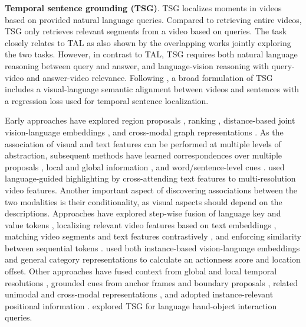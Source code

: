 \noindent
\textbf{Temporal sentence grounding (TSG)}. TSG  localizes moments in videos based on provided natural language queries. Compared to retrieving entire videos, TSG only retrieves relevant segments from a video based on queries. The task closely relates to TAL as also shown by the overlapping works  jointly exploring the two tasks. However, in contrast to TAL, TSG requires both natural language reasoning between query and answer, and language-vision reasoning with query-video and answer-video relevance. Following , a broad formulation of TSG includes a visual-language semantic alignment between videos and sentences with a regression loss used for temporal sentence localization.



Early approaches have explored region proposals , ranking , distance-based joint vision-language embeddings , and cross-modal graph representations . As
the association of visual and text features can be performed at multiple levels of abstraction, subsequent methods have learned correspondences over multiple proposals , local and global information , and word/sentence-level cues .  used language-guided highlighting by cross-attending text features to multi-resolution video features. Another important aspect of discovering associations between the two modalities is their conditionality, as visual aspects should depend on the descriptions. Approaches have explored step-wise fusion of language key and value tokens 
, localizing relevant video features based on text embeddings , matching video segments and text features contrastively , and enforcing similarity between sequential tokens .  used both instance-based vision-language embeddings and general category representations to calculate an actionness score and location offset. Other approaches have fused context from global and local temporal resolutions , grounded cues from anchor frames and boundary proposals , related unimodal and cross-modal representations , and adopted instance-relevant positional information .  explored TSG for language hand-object interaction queries.


